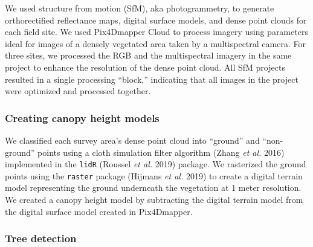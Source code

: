 \documentclass[]{article}
\begin{document}
We used structure from motion (SfM), aka photogrammetry, to generate
orthorectified reflectance maps, digital surface models, and dense point
clouds for each field site. We used Pix4Dmapper Cloud to process imagery
using parameters ideal for images of a densely vegetated area taken by a
multispectral camera. For three sites, we processed the RGB and the
multispectral imagery in the same project to enhance the resolution of
the dense point cloud. All SfM projects resulted in a single processing
``block,'' indicating that all images in the project were optimized and
processed together.

\subsubsection{Creating canopy height
models}\label{creating-canopy-height-models}

We classified each survey area's dense point cloud into ``ground'' and
``non-ground'' points using a cloth simulation filter algorithm (Zhang
\emph{et al.} 2016) implemented in the \texttt{lidR} (Roussel \emph{et
al.} 2019) package. We rasterized the ground points using the
\texttt{raster} package (Hijmans \emph{et al.} 2019) to create a digital
terrain model representing the ground underneath the vegetation at 1
meter resolution. We created a canopy height model by subtracting the
digital terrain model from the digital surface model created in
Pix4Dmapper.

\subsubsection{Tree detection}\label{tree-detection}
\end{document}

